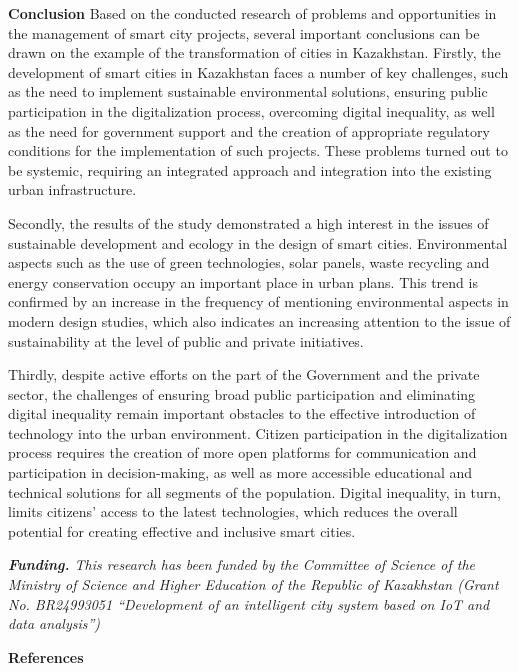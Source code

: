 {{\bfseries Conclusion} Based on the conducted research of problems and
opportunities in the management of smart city projects, several
important conclusions can be drawn on the example of the transformation
of cities in Kazakhstan. Firstly, the development of smart cities in
Kazakhstan faces a number of key challenges, such as the need to
implement sustainable environmental solutions, ensuring public
participation in the digitalization process, overcoming digital
inequality, as well as the need for government support and the creation
of appropriate regulatory conditions for the implementation of such
projects. These problems turned out to be systemic, requiring an
integrated approach and integration into the existing urban
infrastructure.

Secondly, the results of the study demonstrated a high interest in the
issues of sustainable development and ecology in the design of smart
cities. Environmental aspects such as the use of green technologies,
solar panels, waste recycling and energy conservation occupy an
important place in urban plans. This trend is confirmed by an increase
in the frequency of mentioning environmental aspects in modern design
studies, which also indicates an increasing attention to the issue of
sustainability at the level of public and private initiatives.

Thirdly, despite active efforts on the part of the Government and the
private sector, the challenges of ensuring broad public participation
and eliminating digital inequality remain important obstacles to the
effective introduction of technology into the urban environment. Citizen
participation in the digitalization process requires the creation of
more open platforms for communication and participation in
decision-making, as well as more accessible educational and technical
solutions for all segments of the population. Digital inequality, in
turn, limits citizens'{} access to the latest
technologies, which reduces the overall potential for creating effective
and inclusive smart cities.

\emph{{\bfseries Funding.} This research has been funded by the Committee
of Science of the Ministry of Science and Higher Education of the
Republic of Kazakhstan (Grant No. BR24993051 ``Development of an
intelligent city system based on IoT and data analysis'')}

{\bfseries References}

}
